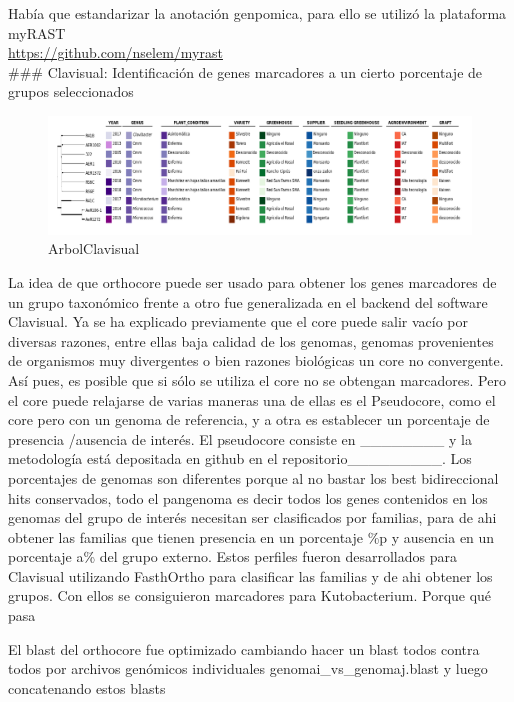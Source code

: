 \documentclass[]{article}
\begin{document}
Había que estandarizar la anotación genpomica, para ello se utilizó la
plataforma myRAST\\
\url{https://github.com/nselem/myrast}\\
\#\#\# Clavisual: Identificación de genes marcadores a un cierto
porcentaje de grupos seleccionados

\begin{figure}[h!tbp]
\centering
\includegraphics[angle = 0,scale = 1]{chapter1/ArbolClavisual.png}
\caption[ArbolClavisual]{\normalsize{ArbolClavisual}}
\label{fig:ArbolClavisual}
\end{figure}

La idea de que orthocore puede ser usado para obtener los genes
marcadores de un grupo taxonómico frente a otro fue generalizada en el
backend del software Clavisual. Ya se ha explicado previamente que el
core puede salir vacío por diversas razones, entre ellas baja calidad de
los genomas, genomas provenientes de organismos muy divergentes o bien
razones biológicas un core no convergente. Así pues, es posible que si
sólo se utiliza el core no se obtengan marcadores. Pero el core puede
relajarse de varias maneras una de ellas es el Pseudocore, como el core
pero con un genoma de referencia, y a otra es establecer un porcentaje
de presencia /ausencia de interés. El pseudocore consiste en
\_\_\_\_\_\_\_\_ y la metodología está depositada en github en el
repositorio\_\_\_\_\_\_\_\_\_. Los porcentajes de genomas son diferentes
porque al no bastar los best bidireccional hits conservados, todo el
pangenoma es decir todos los genes contenidos en los genomas del grupo
de interés necesitan ser clasificados por familias, para de ahi obtener
las familias que tienen presencia en un porcentaje \%p y ausencia en un
porcentaje a\% del grupo externo. Estos perfiles fueron desarrollados
para Clavisual utilizando FasthOrtho para clasificar las familias y de
ahi obtener los grupos. Con ellos se consiguieron marcadores para
Kutobacterium. Porque qué pasa

El blast del orthocore fue optimizado cambiando hacer un blast todos
contra todos por archivos genómicos individuales
genomai\_vs\_genomaj.blast y luego concatenando estos blasts
\end{document}
